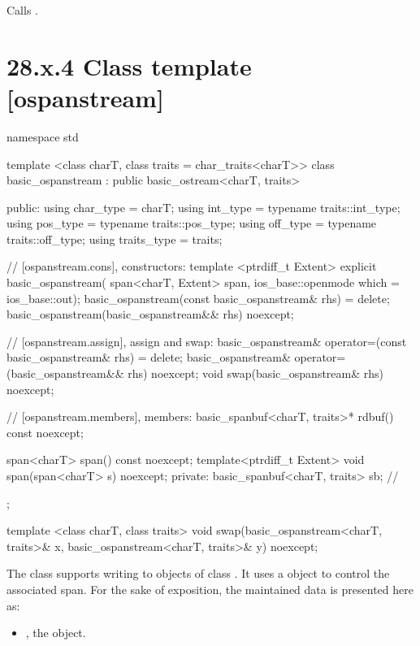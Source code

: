 \documentclass[ebook,11pt,article]{memoir}
\renewcommand{\iref}[1]{[#1]}
\begin{document}
\begin{itemdescr}
\pnum
\effects
Calls
.
\end{itemdescr}

\section{28.x.4 Class template  [ospanstream] }

\begin{codeblock}
namespace std {
  template <class charT, class traits = char_traits<charT>>
  class basic_ospanstream
    : public basic_ostream<charT, traits> {
  public:
    using char_type      = charT;
    using int_type       = typename traits::int_type;
    using pos_type       = typename traits::pos_type;
    using off_type       = typename traits::off_type;
    using traits_type    = traits;

    // \iref{ospanstream.cons}, constructors:
    template <ptrdiff_t Extent>
    explicit basic_ospanstream(
      span<charT, Extent> span,
      ios_base::openmode which = ios_base::out);
    basic_ospanstream(const basic_ospanstream& rhs) = delete;
    basic_ospanstream(basic_ospanstream&& rhs) noexcept;

    // \iref{ospanstream.assign}, assign and swap:
    basic_ospanstream& operator=(const basic_ospanstream& rhs) = delete;
    basic_ospanstream& operator=(basic_ospanstream&& rhs) noexcept;
    void swap(basic_ospanstream& rhs) noexcept;

    // \iref{ospanstream.members}, members:
    basic_spanbuf<charT, traits>* rdbuf() const noexcept;

    span<charT> span() const noexcept;
	template<ptrdiff_t Extent>
    void span(span<charT> s) noexcept;
  private:
    basic_spanbuf<charT, traits> sb; // \expos
  };

  template <class charT, class traits>
    void swap(basic_ospanstream<charT, traits>& x,
              basic_ospanstream<charT, traits>& y) noexcept;
}
\end{codeblock}

\pnum
The class
supports writing to objects of class
.
It uses a
object to control the associated span.
For the sake of exposition, the maintained data is presented here as:
\begin{itemize}
\item
{}, the  object.
\end{itemize}
\end{document}
